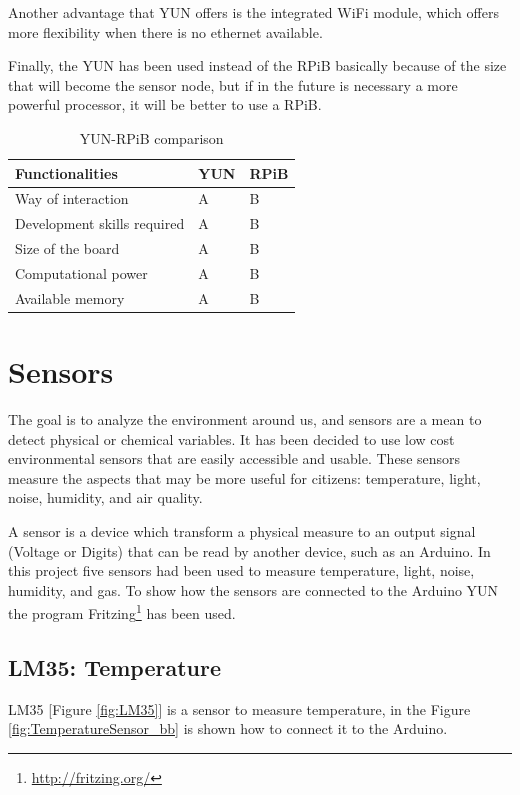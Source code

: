 \documentclass[12pt, a4paper,twoside]{tesi_upf}
\begin{document}
    Another advantage that YUN offers is the integrated WiFi module, which offers more flexibility when there is no ethernet available.
    
    Finally, the YUN has been used instead of the RPiB basically because of the size that will become the sensor node, but if in the future is necessary a more powerful processor, it will be better to use a RPiB.  
    
    \begin{table}
    	\centering
		  \begin{tabular}{ | l | p{5cm} | p{5cm} |}
				\hline
				Functionalities & YUN & RPiB \\ \hline
				Way of interaction & A & B \\ \hline
				Development skills required & A & B \\ \hline
				Size of the board & A & B \\ \hline
				Computational power & A & B \\ \hline
				Available memory & A & B \\ \hline
		  \end{tabular}
      \caption{YUN-RPiB comparison}
      \label{tab:YUN-RPiBcomparisonfig:sensorboards}
		\end{table}

  \section{Sensors}
    The goal is to analyze the environment around us, and sensors are a mean to detect physical or chemical variables. It has been decided to use low cost environmental sensors that are easily accessible and usable. 
    These sensors measure the aspects that may be more useful for citizens: temperature, light, noise, humidity, and air quality.
    
    A sensor is a device which transform a physical measure to an output signal (Voltage or Digits) that can be read by another device, such as an Arduino.
    In this project five sensors had been used to measure temperature, light, noise, humidity, and gas.
    To show how the sensors are connected to the Arduino YUN the program Fritzing\footnote{\url{http://fritzing.org/}} has been used.
    
    \subsection{LM35: Temperature}
      LM35 [Figure \ref{fig:LM35}] is a sensor to measure temperature, in the Figure \ref{fig:TemperatureSensor_bb} is shown how to connect it to the Arduino.
      \cite{LM35}
      
\end{document}
